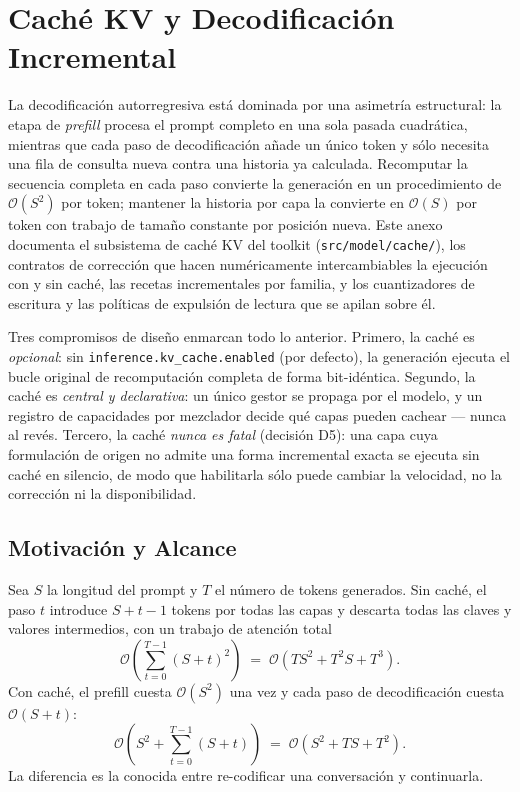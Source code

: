 \section{Caché KV y Decodificación Incremental}
\label{sec:annex-kv-cache}

La decodificación autorregresiva está dominada por una asimetría estructural: la etapa de \emph{prefill} procesa el prompt completo en una sola pasada cuadrática, mientras que cada paso de decodificación añade un único token y sólo necesita una fila de consulta nueva contra una historia ya calculada. Recomputar la secuencia completa en cada paso convierte la generación en un procedimiento de $\mathcal{O}(S^2)$ por token; mantener la historia por capa la convierte en $\mathcal{O}(S)$ por token con trabajo de tamaño constante por posición nueva. Este anexo documenta el subsistema de caché KV del toolkit (\texttt{src/model/cache/}), los contratos de corrección que hacen numéricamente intercambiables la ejecución con y sin caché, las recetas incrementales por familia, y los cuantizadores de escritura y las políticas de expulsión de lectura que se apilan sobre él.

Tres compromisos de diseño enmarcan todo lo anterior. Primero, la caché es \emph{opcional}: sin \texttt{inference.kv\_cache.enabled} (por defecto), la generación ejecuta el bucle original de recomputación completa de forma bit-idéntica. Segundo, la caché es \emph{central y declarativa}: un único gestor se propaga por el modelo, y un registro de capacidades por mezclador decide qué capas pueden cachear --- nunca al revés. Tercero, la caché \emph{nunca es fatal} (decisión D5): una capa cuya formulación de origen no admite una forma incremental exacta se ejecuta sin caché en silencio, de modo que habilitarla sólo puede cambiar la velocidad, no la corrección ni la disponibilidad.

\subsection{Motivación y Alcance}

Sea $S$ la longitud del prompt y $T$ el número de tokens generados. Sin caché, el paso $t$ introduce $S+t-1$ tokens por todas las capas y descarta todas las claves y valores intermedios, con un trabajo de atención total
\[
\mathcal{O}\!\left(\sum_{t=0}^{T-1} (S+t)^2\right) \;=\; \mathcal{O}\!\left(T S^2 + T^2 S + T^3\right).
\]
Con caché, el prefill cuesta $\mathcal{O}(S^2)$ una vez y cada paso de decodificación cuesta $\mathcal{O}(S+t)$:
\[
\mathcal{O}\!\left(S^2 + \sum_{t=0}^{T-1}(S+t)\right) \;=\; \mathcal{O}\!\left(S^2 + TS + T^2\right).
\]
La diferencia es la conocida entre re-codificar una conversación y continuarla.

